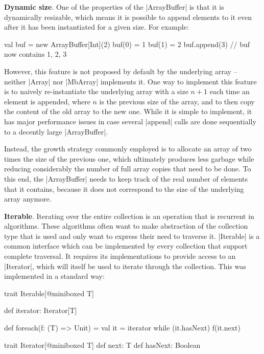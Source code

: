 \textbf{Dynamic size}. One of the properties of the |ArrayBuffer| is that it is dynamically resizable, which means it is possible to append elements to it even after it has been instantiated for a given size. For example: 

\begin{lstlisting-nobreak}
val buf = new ArrayBuffer[Int](2)
buf(0) = 1
buf(1) = 2
buf.append(3) // buf now contains {1, 2, 3}
\end{lstlisting-nobreak}

However, this feature is not proposed by default by the underlying array -- neither |Array| nor |MbArray| implements it. One way to implement this feature is to naively re-instantiate the underlying array with a size $n + 1$ each time an element is appended, where $n$ is the previous size of the array, and to then copy the content of the old array to the new one.
While it is simple to implement, it has major performance issues in case several |append| calls are done sequentially to a decently large |ArrayBuffer|.

Instead, the growth strategy commonly employed is to allocate an array of two times the size of the previous one, which ultimately produces less garbage while reducing considerably the number of full array copies that need to be done. To this end, the |ArrayBuffer| needs to keep track of the real number of elements that it contains, because it does not correspond to the size of the underlying array anymore. 
 
\textbf{Iterable}. Iterating over the entire collection is an operation that is recurrent in algorithms. These algorithms often want to make abstraction of the collection type that is used and only want to express their need to traverse it. |Iterable| is a common interface which can be implemented by every collection that support complete traversal. It requires its implementations to provide access to an |Iterator|, which will itself be used to iterate through the collection. This was implemented in a standard way:

\begin{lstlisting-nobreak}
trait Iterable[@miniboxed T] {
  def iterator: Iterator[T]

  def foreach(f: (T) => Unit) = {
    val it = iterator
    while (it.hasNext) {
      f(it.next)
    }
  }
}

trait Iterator[@miniboxed T] {
  def next: T
  def hasNext: Boolean
}
\end{lstlisting-nobreak}

